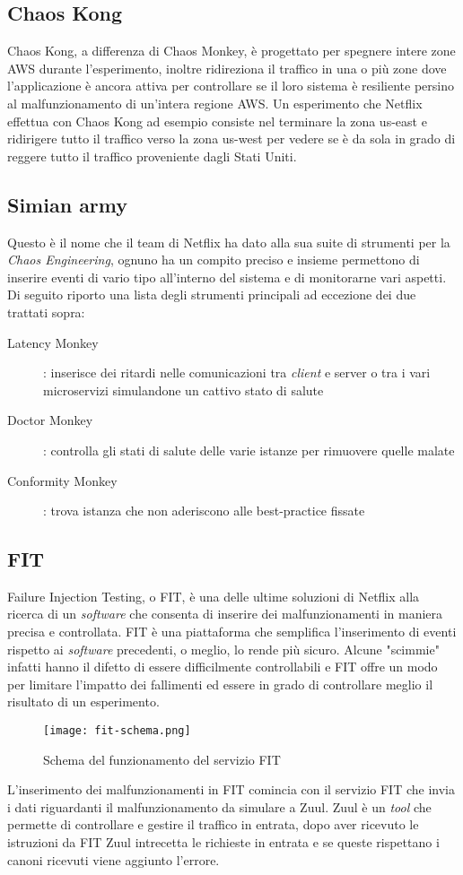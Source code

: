 \subsection{Chaos Kong}
Chaos Kong, a differenza di Chaos Monkey, è progettato per spegnere intere zone AWS durante l'esperimento, inoltre ridireziona il traffico in una o più zone dove l'applicazione è ancora attiva per controllare se il loro sistema è resiliente persino al malfunzionamento di un'intera regione AWS.
Un esperimento che Netflix effettua con Chaos Kong ad esempio consiste nel terminare la zona us-east e ridirigere tutto il traffico verso la zona us-west per vedere se è da sola in grado di reggere tutto il traffico proveniente dagli Stati Uniti.

\subsection{Simian army}
Questo è il nome che il team di Netflix ha dato alla sua suite di strumenti per la \textit{Chaos Engineering}, ognuno ha un compito preciso e insieme permettono di inserire eventi di vario tipo all'interno del sistema e di monitorarne vari aspetti.
Di seguito riporto una lista degli strumenti principali ad eccezione dei due trattati sopra:
\begin{description}
    \item[Latency Monkey]: inserisce dei ritardi nelle comunicazioni tra \textit{client} e server o tra i vari microservizi simulandone un cattivo stato di salute
    \item[Doctor Monkey]: controlla gli stati di salute delle varie istanze per rimuovere quelle malate
    \item[Conformity Monkey]: trova istanza che non aderiscono alle best-practice fissate
\end{description}

\subsection{FIT}
Failure Injection Testing, o FIT, è una delle ultime soluzioni di Netflix alla ricerca di un \textit{software} che consenta di inserire dei malfunzionamenti in maniera precisa e controllata.
FIT è una piattaforma che semplifica l'inserimento di eventi rispetto ai \textit{software} precedenti, o meglio, lo rende più sicuro.
Alcune "scimmie" infatti hanno il difetto di essere difficilmente controllabili e FIT offre un modo per limitare l'impatto dei fallimenti ed essere in grado di controllare meglio il risultato di un esperimento.
\begin{figure}[H]
    \centering
    \texttt{[image: fit-schema.png]}
    \label{tab:fitschema}
    \caption{Schema del funzionamento del servizio FIT}
\end{figure}
L'inserimento dei malfunzionamenti in FIT comincia con il servizio FIT che invia i dati riguardanti il malfunzionamento da simulare a Zuul.
Zuul è un \textit{tool} che permette di controllare e gestire il traffico in entrata, dopo aver ricevuto le istruzioni da FIT Zuul intrecetta le richieste in entrata e se queste rispettano i canoni ricevuti viene aggiunto l'errore.

